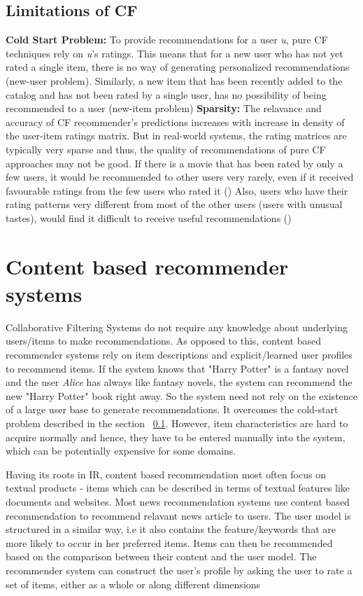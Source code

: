 \subsection{Limitations of CF}
\label{sec:limCF}
\textbf{Cold Start Problem:} To provide recommendations for a user \textit{u}, pure CF techniques rely on \textit{u}'s ratings. This means that for a new user who has not yet rated a single item, there is no way of generating personalized recommendations (new-user problem). 
Similarly, a new item that has been recently added to the catalog and has not been rated by a single user, has no possibility of being recommended to a user (new-item problem)
\textbf{Sparsity:} The relavance and accuracy of CF recommender's predictions increases with increase in density of the user-item ratings matrix.
But in real-world systems, the rating matrices are typically very sparse and thus, the quality of recommendations of pure CF approaches may not be good.
If there is a movie that has been rated by only a few users, it would be recommended to other users very rarely, even if it received favourable ratings from the few users who rated it (\cite{adom2005})
Also, users who have their rating patterns very different from most of the other users (users with unusual tastes), would find it difficult to receive useful recommendations (\cite{balab1997})




%

%

\section{Content based recommender systems}
Collaborative Filtering Systems do not require any knowledge about underlying users/items to make recommendations.
As opposed to this, content based recommender systems rely on item descriptions and explicit/learned user profiles to recommend items.
If the system knows that "Harry Potter" is a fantasy novel and the user \textit{Alice} has always like fantasy novels, the system can recommend the new "Harry Potter" book right away. So the system need not rely on the existence of a large user base to generate recommendations.
It overcomes the cold-start problem described in the section ~\ref{sec:limCF}. However, item characteristics are hard to acquire normally and hence, they have to be entered manually into the system, which can be potentially expensive for some domains.

Having its roots in IR, content based recommendation most often focus on textual products - items which can be described in terms of textual features like documents and websites. \cite{adom2005}
Most news recommendation systems use content based recommendation to recommend relavant news article to users.
The user model is structured in a similar way, i.e it also contains the feature/keywords that are more likely to occur in her preferred items. 
Items can then be recommended based on the comparison between their content and the user model. 
The recommender system can construct the user's profile by asking the user to rate a set of items, either as a whole or along different dimensions

